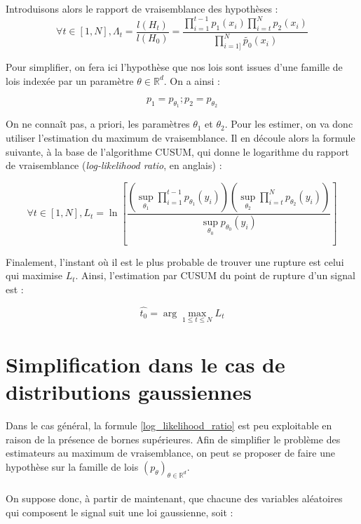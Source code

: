 \documentclass[french,12pt,notitlepage]{report}
\begin{document}
	Introduisons alors le rapport de vraisemblance des hypothèses :
	\begin{equation}
		\forall t \in [1, N], \Lambda_t = \frac{l(H_t)}{l(H_0)} = \frac{\prod_{i = 1}^{t-1} p_1(x_i) \prod_{i = t}^{N} p_2(x_i)}{\prod_{i = 1]}^{N} \tilde{p_0}(x_i)}
	\end{equation}

	Pour simplifier, on fera ici l'hypothèse que nos lois sont issues d'une famille de lois indexée par un paramètre $\theta \in \mathbb{R}^d$. On a ainsi :

	\begin{equation*}
		p_1 = p_{\theta_1} ; p_2 = p_{\theta_2}
	\end{equation*}

	On ne connaît pas, a priori, les paramètres $\theta_1$ et $\theta_2$. Pour les estimer, on va donc utiliser l'estimation du maximum de vraisemblance. Il en découle alors la formule suivante, à la base de l'algorithme CUSUM, qui donne le logarithme du rapport de vraisemblance (\textit{log-likelihood ratio}, en anglais) :

	\begin{equation}
		\forall t \in [1, N], L_t=\ln\left[\frac{\left(\sup_{\theta_1}\prod_{i=1}^{t-1}p_{\theta_1}(y_i)\right)\left(\sup_{\theta_2}\prod_{i=t}^Np_{\theta_2}(y_i)\right)}{\sup_{\theta_0}p_{\theta_0}(y_i)}\right]
		\label{log_likelihood_ratio}
	\end{equation}

	Finalement, l'instant où il est le plus probable de trouver une rupture est celui qui maximise $L_t$. Ainsi, l'estimation par CUSUM du point de rupture d'un signal est :

	\begin{equation}
		\hat{t_0}=\arg\max_{1\le t\le N}L_t
	\end{equation}

	\section{Simplification dans le cas de distributions gaussiennes}
	Dans le cas général, la formule \ref{log_likelihood_ratio} est peu exploitable en raison de la présence de bornes supérieures. Afin de simplifier le problème des estimateurs au maximum de vraisemblance, on peut se proposer de faire une hypothèse sur la famille de lois $(p_\theta)_{\theta \in \mathbb{R}^d}$.
	\\ \\
	On suppose donc, à partir de maintenant, que chacune des variables aléatoires qui composent le signal suit une loi gaussienne, soit :
\end{document}
